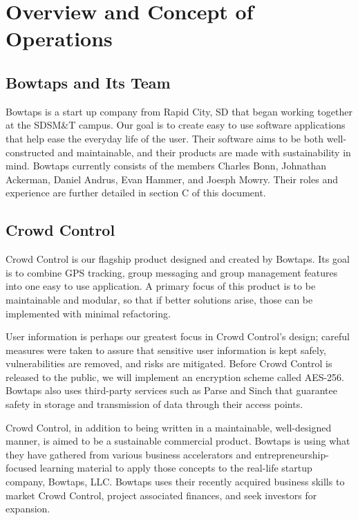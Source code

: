 

\chapter{Overview and Concept of Operations}


\section{Bowtaps and Its Team}

Bowtaps is a start up company from Rapid City, SD that began working together at the SDSM\&T campus. Our goal is to create easy to use software applications that help ease the everyday life of the user. Their software aims to be both well-constructed and maintainable, and their products are made with sustainability in mind. Bowtaps currently consists of the members Charles Bonn, Johnathan Ackerman, Daniel Andrus, Evan Hammer, and Joesph Mowry. Their roles and experience are further detailed in section C of this document.

\section{Crowd Control}
Crowd Control is our flagship product designed and created by Bowtaps. Its goal is to combine GPS tracking, group messaging and group management features into one easy to use application. A primary focus of this product is to be maintainable and modular, so that if better solutions arise, those can be implemented with minimal refactoring.

User information is perhaps our greatest focus in Crowd Control's design; careful measures were taken to assure that sensitive user information is kept safely, vulnerabilities are removed, and risks are mitigated. Before Crowd Control is released to the public, we will implement an encryption scheme called AES-256. Bowtaps also uses third-party services such as Parse and Sinch that guarantee safety in storage and transmission of data through their access points.

Crowd Control, in addition to being written in a maintainable, well-designed manner, is aimed to be a sustainable commercial product. Bowtaps is using what they have gathered from various business accelerators and entrepreneurship-focused learning material to apply those concepts to the real-life startup company, Bowtaps, LLC. Bowtaps uses their recently acquired business skills to market Crowd Control, project associated finances, and seek investors for expansion.

